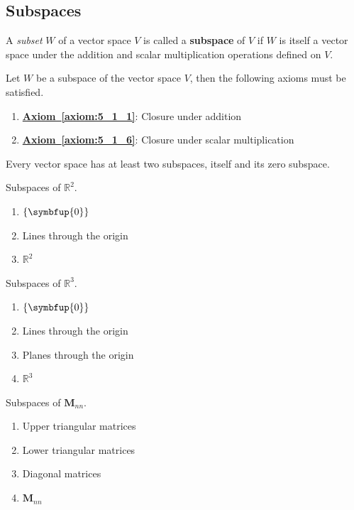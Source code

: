 \documentclass{article}
\begin{document}
\subsection{Subspaces}
\begin{definition}
    A \textit{subset} \(W\) of a vector space \(V\) is called a
    \textbf{subspace} of \(V\) if \(W\) is itself a vector space under
    the addition and scalar multiplication operations defined on \(V\).
\end{definition}
\begin{theorem}
    Let \(W\) be a subspace of the vector space \(V\), then the
    following axioms must be satisfied.
    \begin{enumerate}
        \item \textbf{\hyperref[axiom:5_1_1]{Axiom~\ref{axiom:5_1_1}}}:
              Closure under addition
        \item \textbf{\hyperref[axiom:5_1_6]{Axiom~\ref{axiom:5_1_6}}}:
              Closure under scalar multiplication
    \end{enumerate}
\end{theorem}
\begin{theorem}
    Every vector space has at least two subspaces, itself and its zero
    subspace.
\end{theorem}
\begin{theorem}
    Subspaces of \(\mathbb{R}^2\).
    \begin{enumerate}
        \item \(\left\{ \symbfup{0} \right\}\)
        \item Lines through the origin
        \item \(\mathbb{R}^2\)
    \end{enumerate}
\end{theorem}
\begin{theorem}
    Subspaces of \(\mathbb{R}^3\).
    \begin{enumerate}
        \item \(\left\{ \symbfup{0} \right\}\)
        \item Lines through the origin
        \item Planes through the origin
        \item \(\mathbb{R}^3\)
    \end{enumerate}
\end{theorem}
\begin{theorem}
    Subspaces of \(\symbf{M}_{nn}\).
    \begin{enumerate}
        \item Upper triangular matrices
        \item Lower triangular matrices
        \item Diagonal matrices
        \item \(\symbf{M}_{nn}\)
    \end{enumerate}
\end{theorem}
\end{document}

